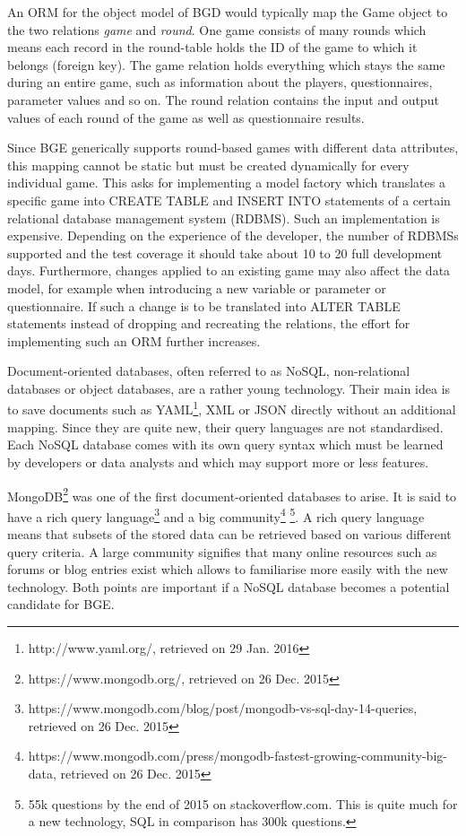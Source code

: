 An ORM for the object model of BGD would typically map the Game object to the two relations \textit{game} and \textit{round}. One game consists of many rounds which means each record in the round-table holds the ID of the game to which it belongs (foreign key). The game relation holds everything which stays the same during an entire game, such as information about the players, questionnaires, parameter values and so on. The round relation contains the input and output values of each round of the game as well as questionnaire results. 

Since BGE generically supports round-based games with different data attributes, this mapping cannot be static but must be created dynamically for every individual game. This asks for implementing a model factory which translates a specific game into CREATE TABLE and INSERT INTO statements of a certain relational database management system (RDBMS). Such an implementation is expensive. Depending on the experience of the developer, the number of RDBMSs supported and the test coverage it should take about 10 to 20 full development days. Furthermore, changes applied to an existing game may also affect the data model, for example when introducing a new variable or parameter or questionnaire. If such a change is to be translated into ALTER TABLE statements instead of dropping and recreating the relations, the effort for implementing such an ORM further increases. 

Document-oriented databases, often referred to as NoSQL, non-relational databases or object databases, are a rather young technology. Their main idea is to save documents such as YAML\footnote{http://www.yaml.org/, retrieved on 29 Jan. 2016}, XML or JSON directly without an additional mapping. Since they are quite new, their query languages are not standardised. Each NoSQL database comes with its own query syntax which must be learned by developers or data analysts and which may support more or less features.

MongoDB\footnote{https://www.mongodb.org/, retrieved on 26 Dec. 2015} was one of the first document-oriented databases to arise. It is said to have a rich query language\footnote{https://www.mongodb.com/blog/post/mongodb-vs-sql-day-14-queries, retrieved on 26 Dec. 2015} and a big community\footnote{https://www.mongodb.com/press/mongodb-fastest-growing-community-big-data, retrieved on 26 Dec. 2015} \footnote{55k questions by the end of 2015 on stackoverflow.com. This is quite much for a new technology, SQL in comparison has 300k questions.}. A rich query language means that subsets of the stored data can be retrieved based on various different query criteria. A large community signifies that many online resources such as forums or blog entries exist which allows to familiarise more easily with the new technology. Both points are important if a NoSQL database becomes a potential candidate for BGE.

